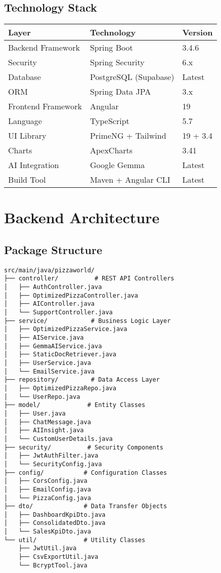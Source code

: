 \documentclass[11pt,a4paper]{article}
\begin{document}
\subsection{Technology Stack}

\begin{longtable}{|l|l|l|}
\hline
\textbf{Layer} & \textbf{Technology} & \textbf{Version} \\
\hline
\endhead
Backend Framework & Spring Boot & 3.4.6 \\
\hline
Security & Spring Security & 6.x \\
\hline
Database & PostgreSQL (Supabase) & Latest \\
\hline
ORM & Spring Data JPA & 3.x \\
\hline
Frontend Framework & Angular & 19 \\
\hline
Language & TypeScript & 5.7 \\
\hline
UI Library & PrimeNG + Tailwind & 19 + 3.4 \\
\hline
Charts & ApexCharts & 3.41 \\
\hline
AI Integration & Google Gemma & Latest \\
\hline
Build Tool & Maven + Angular CLI & Latest \\
\hline
\end{longtable}

\section{Backend Architecture}

\subsection{Package Structure}

\begin{lstlisting}[language=text, caption=Backend Package Organization]
src/main/java/pizzaworld/
├── controller/          # REST API Controllers
│   ├── AuthController.java
│   ├── OptimizedPizzaController.java
│   ├── AIController.java
│   └── SupportController.java
├── service/            # Business Logic Layer
│   ├── OptimizedPizzaService.java
│   ├── AIService.java
│   ├── GemmaAIService.java
│   ├── StaticDocRetriever.java
│   ├── UserService.java
│   └── EmailService.java
├── repository/         # Data Access Layer
│   ├── OptimizedPizzaRepo.java
│   └── UserRepo.java
├── model/             # Entity Classes
│   ├── User.java
│   ├── ChatMessage.java
│   ├── AIInsight.java
│   └── CustomUserDetails.java
├── security/          # Security Components
│   ├── JwtAuthFilter.java
│   └── SecurityConfig.java
├── config/           # Configuration Classes
│   ├── CorsConfig.java
│   ├── EmailConfig.java
│   └── PizzaConfig.java
├── dto/              # Data Transfer Objects
│   ├── DashboardKpiDto.java
│   ├── ConsolidatedDto.java
│   └── SalesKpiDto.java
└── util/             # Utility Classes
    ├── JwtUtil.java
    ├── CsvExportUtil.java
    └── BcryptTool.java
\end{lstlisting}
\end{document}
